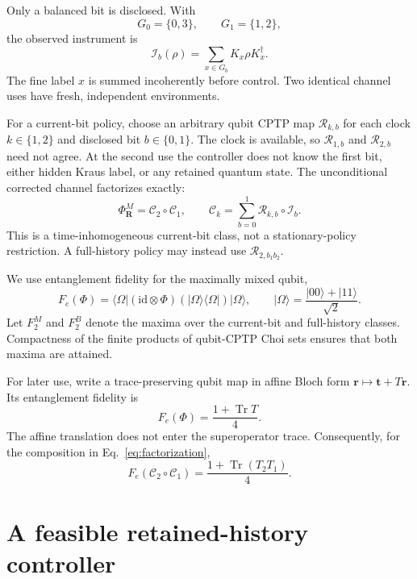 \documentclass[11pt]{article}
\newcommand{\cI}{\mathcal I}
\newcommand{\cR}{\mathcal R}
\newcommand{\cC}{\mathcal C}
\newcommand{\id}{\mathrm{id}}
\newcommand{\Tr}{\operatorname{Tr}}
\begin{document}
Only a balanced bit is disclosed. With
\begin{equation}
 G_0=\{0,3\},\qquad G_1=\{1,2\},
 \label{eq:groups}
\end{equation}
the observed instrument is
\begin{equation}
 \cI_b(\rho)=\sum_{x\in G_b}K_x\rho K_x^\dagger.
 \label{eq:instrument}
\end{equation}
The fine label $x$ is summed incoherently before control. Two identical channel uses
have fresh, independent environments.

For a current-bit policy, choose an arbitrary qubit CPTP map $\cR_{k,b}$ for each
clock $k\in\{1,2\}$ and disclosed bit $b\in\{0,1\}$. The clock is available, so
$\cR_{1,b}$ and $\cR_{2,b}$ need not agree. At the second use the controller does
not know the first bit, either hidden Kraus label, or any retained quantum state.
The unconditional corrected channel factorizes exactly:
\begin{equation}
 \Phi^M_{\bm R}=\cC_2\circ\cC_1,
 \qquad
 \cC_k=\sum_{b=0}^1\cR_{k,b}\circ\cI_b.
 \label{eq:factorization}
\end{equation}
This is a time-inhomogeneous current-bit class, not a stationary-policy restriction.
A full-history policy may instead use $\cR_{2,b_1b_2}$.

We use entanglement fidelity for the maximally mixed qubit,
\begin{equation}
 F_e(\Phi)=\langle\Omega| (\id\otimes\Phi)
 (|\Omega\rangle\langle\Omega|)|\Omega\rangle,
 \qquad |\Omega\rangle=\frac{|00\rangle+|11\rangle}{\sqrt2}.
 \label{eq:fidelity}
\end{equation}
Let $F_2^M$ and $F_2^B$ denote the maxima over the current-bit and full-history
classes. Compactness of the finite products of qubit-CPTP Choi sets ensures that
both maxima are attained.

For later use, write a trace-preserving qubit map in affine Bloch form
$\bm r\mapsto\bm t+T\bm r$. Its entanglement fidelity is
\begin{equation}
 F_e(\Phi)=\frac{1+\Tr T}{4}.
 \label{eq:bloch-fidelity}
\end{equation}
The affine translation does not enter the superoperator trace. Consequently, for
the composition in Eq.~\eqref{eq:factorization},
\begin{equation}
 F_e(\cC_2\circ\cC_1)=\frac{1+\Tr(T_2T_1)}4.
 \label{eq:composition-fidelity}
\end{equation}

\section{A feasible retained-history controller}
\label{sec:witness}
\end{document}
